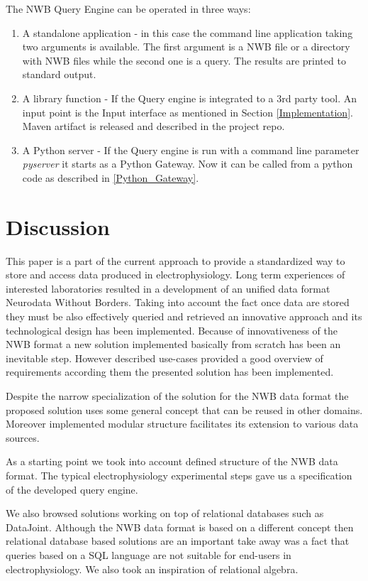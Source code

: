 \documentclass[utf8]{frontiersSCNS} %
\begin{document}
The NWB Query Engine can be operated in three ways:
\begin{enumerate}
 \item A standalone application - in this case the command line application taking two arguments is available. The first argument is a NWB file or a directory with NWB files while the second one is a query. The results are printed to standard output.
 \item A library function - If the Query engine is integrated to a 3rd party tool. An input point is the Input interface as mentioned in Section \ref{Implementation}. Maven artifact is released and described in the project repo.
 \item A Python server - If the Query engine is run with a command line parameter \emph{pyserver} it starts as a Python Gateway. Now it can be called from a python code as described in \ref{Python_Gateway}.
\end{enumerate}


\section{Discussion}
\label{Discussion}

This paper is a part of the current approach to provide a standardized way to store and access data produced in electrophysiology. Long term experiences of interested laboratories resulted in a development of an unified data format Neurodata Without Borders. Taking into account the fact once data are stored they must be also effectively queried and retrieved an innovative approach and its technological design has been implemented. Because of innovativeness of the NWB format a new solution implemented basically from scratch has been an inevitable step. However described use-cases provided a good overview of requirements according them the presented solution has been implemented.

Despite the narrow specialization of the solution for the NWB data format the proposed solution uses some general concept that can be reused in other domains. Moreover implemented modular structure facilitates its extension to various data sources.

As a starting point we took into account defined structure of the NWB data format. The typical electrophysiology experimental steps gave us a specification of the developed query engine. 

We also browsed solutions working on top of relational databases such as DataJoint. Although the NWB data format is based on a different concept then relational database based solutions are an important take away was a fact that queries based on a SQL language are not suitable for end-users in electrophysiology. We also took an inspiration of relational algebra.
\end{document}
